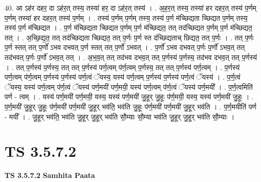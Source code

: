 \documentclass[17pt]{extarticle}
\begin{document}
40. आ ऽह॑र दहर॒ दा ऽह॑र॒त् तस्य॒ तस्या॑ हर॒ दा ऽह॑र॒त् तस्य॑ । . अ॒ह॒र॒त् तस्य॒ तस्या॑ हर दहर॒त् तस्य॑ प॒र्णम् प॒र्णम् तस्या॑ हर दहर॒त् तस्य॑ प॒र्णम् । . तस्य॑ प॒र्णम् प॒र्णम् तस्य॒ तस्य॑ प॒र्ण म॑च्छिद्यता च्छिद्यत प॒र्णम् तस्य॒ तस्य॑ प॒र्ण म॑च्छिद्यत । . प॒र्ण म॑च्छिद्यता च्छिद्यत प॒र्णम् प॒र्ण म॑च्छिद्यत॒ तत् तद॑च्छिद्यत प॒र्णम् प॒र्ण म॑च्छिद्यत॒ तत् । . अ॒च्छि॒द्य॒त॒ तत् तद॑च्छिद्यता च्छिद्यत॒ तत् प॒र्णः प॒र्ण स्त द॑च्छिद्यताच् छिद्यत॒ तत् प॒र्णः । . तत् प॒र्णः प॒र्ण स्तत् तत् प॒र्णो॑ ऽभव दभवत् प॒र्ण स्तत् तत् प॒र्णो॑ ऽभवत् । . प॒र्णो॑ ऽभव दभवत् प॒र्णः प॒र्णो॑ ऽभव॒त् तत् तद॑भवत् प॒र्णः प॒र्णो॑ ऽभव॒त् तत् । . अ॒भ॒व॒त् तत् तद॑भव दभव॒त् तत् प॒र्णस्य॑ प॒र्णस्य॒ तद॑भव दभव॒त् तत् प॒र्णस्य॑ । . तत् प॒र्णस्य॑ प॒र्णस्य॒ तत् तत् प॒र्णस्य॑ पर्ण॒त्वम् प॑र्ण॒त्वम् प॒र्णस्य॒ तत् तत् प॒र्णस्य॑ पर्ण॒त्वम् । . प॒र्णस्य॑ पर्ण॒त्वम् प॑र्ण॒त्वम् प॒र्णस्य॑ प॒र्णस्य॑ पर्ण॒त्वं ॅयस्य॒ यस्य॑ पर्ण॒त्वम् प॒र्णस्य॑ प॒र्णस्य॑ पर्ण॒त्वं ॅयस्य॑ । . प॒र्ण॒त्वं ॅयस्य॒ यस्य॑ पर्ण॒त्वम् प॑र्ण॒त्वं ॅयस्य॑ पर्ण॒मयी॑ पर्ण॒मयी॒ यस्य॑ पर्ण॒त्वम् प॑र्ण॒त्वं ॅयस्य॑ पर्ण॒मयी᳚ । . प॒र्ण॒त्वमिति॑ पर्ण - त्वम् । . यस्य॑ पर्ण॒मयी॑ पर्ण॒मयी॒ यस्य॒ यस्य॑ पर्ण॒मयी॑ जु॒हूर् जु॒हूः प॑र्ण॒मयी॒ यस्य॒ यस्य॑ पर्ण॒मयी॑ जु॒हूः । . प॒र्ण॒मयी॑ जु॒हूर् जु॒हूः प॑र्ण॒मयी॑ पर्ण॒मयी॑ जु॒हूर् भव॑ति॒ भव॑ति जु॒हूः प॑र्ण॒मयी॑ पर्ण॒मयी॑ जु॒हूर् भव॑ति । . प॒र्ण॒मयीति॑ पर्ण - मयी᳚ । . जु॒हूर् भव॑ति॒ भव॑ति जु॒हूर् जु॒हूर् भव॑ति सौ॒म्याः सौ॒म्या भव॑ति जु॒हूर् जु॒हूर् भव॑ति सौ॒म्याः । \newline
\pagebreak
{}

\section{ TS 3.5.7.2 }

\textbf{TS 3.5.7.2 } \newline
\textbf{Samhita Paata} \newline
\end{document}
